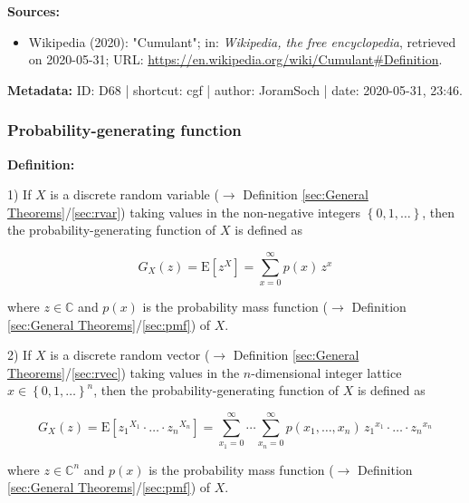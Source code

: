 \documentclass[a4paper,12pt,twoside]{book}
\begin{document}
\vspace{1em}
\textbf{Sources:}
\begin{itemize}
\item Wikipedia (2020): "Cumulant"; in: \textit{Wikipedia, the free encyclopedia}, retrieved on 2020-05-31; URL: \url{https://en.wikipedia.org/wiki/Cumulant#Definition}.
\end{itemize}


\vspace{1em}
\textbf{Metadata:} ID: D68 | shortcut: cgf | author: JoramSoch | date: 2020-05-31, 23:46.
\vspace{1em}



\subsubsection[\textit{Probability-generating function}]{Probability-generating function} \label{sec:pgf}
\setcounter{equation}{0}

\textbf{Definition:}

1) If $X$ is a discrete random variable ($\rightarrow$ Definition \ref{sec:General Theorems}/\ref{sec:rvar}) taking values in the non-negative integers $\left\lbrace 0, 1, \ldots \right\rbrace$, then the probability-generating function of $X$ is defined as

\begin{equation} \label{eq:pgf-pgf-var}
G_X(z) = \mathrm{E} \left[ z^X \right] = \sum_{x=0}^{\infty} p(x) \, z^x
\end{equation}

where $z \in \mathbb{C}$ and $p(x)$ is the probability mass function ($\rightarrow$ Definition \ref{sec:General Theorems}/\ref{sec:pmf}) of $X$.

2) If $X$ is a discrete random vector ($\rightarrow$ Definition \ref{sec:General Theorems}/\ref{sec:rvec}) taking values in the $n$-dimensional integer lattice $x \in \left\lbrace 0, 1, \ldots \right\rbrace^n$, then the probability-generating function of $X$ is defined as

\begin{equation} \label{eq:pgf-cgf-vec}
G_X(z) = \mathrm{E} \left[ {z_1}^{X_1} \cdot \ldots \cdot {z_n}^{X_n} \right] = \sum_{x_1=0}^{\infty} \cdots \sum_{x_n=0}^{\infty} p(x_1,\ldots,x_n) \, {z_1}^{x_1} \cdot \ldots \cdot {z_n}^{x_n}
\end{equation}

where $z \in \mathbb{C}^n$ and $p(x)$ is the probability mass function ($\rightarrow$ Definition \ref{sec:General Theorems}/\ref{sec:pmf}) of $X$.
\end{document}
